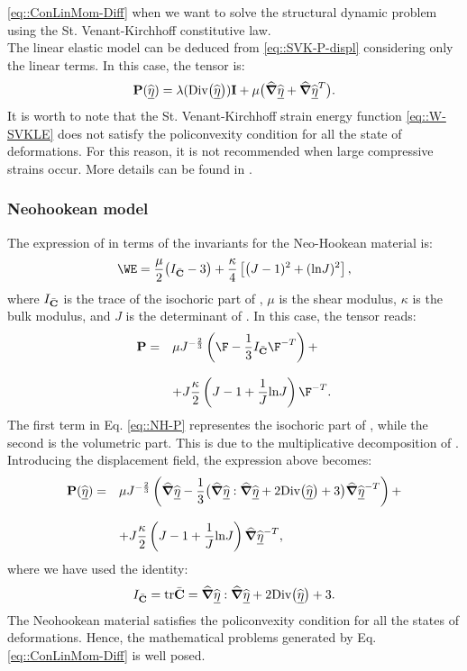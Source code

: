\eqref{eq::ConLinMom-Diff} when we want to solve the structural
dynamic problem using the St. Venant-Kirchhoff constitutive law.\\ The
linear elastic model can be deduced from \eqref{eq::SVK-P-displ}
considering only the linear terms. In this case, the tensor \Piola is:
\begin{equation} \textbf{P}(\widehat{\underline{\eta}}) = \lambda(\text{Div}\big(\widehat{\underline{\eta}}\big))\textbf{I} +
\mu\big(\widehat{\boldsymbol{\nabla}}\widehat{\underline{\eta}} + \widehat{\boldsymbol{\nabla}}\widehat{\underline{\eta}}^T\big).
\label{eq::LE-P}
\end{equation} It is worth to note that the St. Venant-Kirchhoff
strain energy function \eqref{eq::W-SVKLE} does not satisfy the
policonvexity condition for all the state of deformations. For this
reason, it is not recommended when large compressive strains
occur. More details can be found in \cite{Hozapfel}.

\subsubsection{Neohookean model} The expression of \W in terms of the
invariants for the Neo-Hookean material is:
\begin{equation}
\WE=\frac{\mu}{2}\big(I_{\Cbar}-3\big)+\frac{\kappa}{4}\left[\big(J-1)^2
+ (\text{ln}J)^2\right],
\label{eq::strainNH}
\end{equation} where $I_{\bar{\textbf{C}}}$ is the trace of the isochoric part of
\C, $\mu$ is the shear modulus, $\kappa$ is the bulk modulus, and $J$
is the determinant of \F. In this case, the tensor \Piola reads:
\begin{equation}
  \begin{array}{lll} \Piola = & \displaystyle \mu
J^{-\frac{2}{3}}\left(\F-\frac{1}{3}I_{\Cbar}\F^{-T}\right) +\\ \\ &
\displaystyle +
J\frac{\kappa}{2}\left(J-1+\frac{1}{J}\text{ln}J\right)\F^{-T}.
  \end {array}
\label{eq::NH-P}
\end{equation} The first term in Eq. \eqref{eq::NH-P} representes the
isochoric part of \Piola, while the second is the volumetric
part. This is due to the multiplicative decomposition of
\F. Introducing the displacement field, the expression above becomes:
\begin{equation}
  \begin{array}{lll} \textbf{P}(\widehat{\underline{\eta}}) = & \displaystyle \mu
J^{-\frac{2}{3}}\left(\widehat{\boldsymbol{\nabla}}\widehat{\underline{\eta}} -
\frac{1}{3}\big(\widehat{\boldsymbol{\nabla}}\widehat{\underline{\eta}}:\widehat{\boldsymbol{\nabla}}\widehat{\underline{\eta}}+2\text{Div}\big(\widehat{\underline{\eta}}\big)+3\big)\widehat{\boldsymbol{\nabla}}\widehat{\underline{\eta}}^{-T}\right)+\\
\\ & \displaystyle +
J\frac{\kappa}{2}\left(J-1+\frac{1}{J}\text{ln}J\right)\widehat{\boldsymbol{\nabla}}\widehat{\underline{\eta}}^{-T},
  \end{array}
\label{eq::NH-P-displ}
\end{equation} where we have used the identity:
\begin{equation} I_{\bar{\textbf{C}}}=\text{tr}\bar{\textbf{C}}=\widehat{\boldsymbol{\nabla}}\widehat{\underline{\eta}}:\widehat{\boldsymbol{\nabla}}\widehat{\underline{\eta}}
+ 2\text{Div}\big(\widehat{\underline{\eta}}\big)+3.
\label{eq::Id-trC-displ}
\end{equation} The Neohookean material satisfies the policonvexity
condition for all the states of deformations. Hence, the mathematical
problems generated by Eq. \eqref{eq::ConLinMom-Diff} is well posed.

